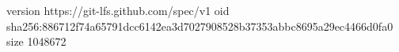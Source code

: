 version https://git-lfs.github.com/spec/v1
oid sha256:886712f74a65791dcc6142ea3d7027908528b37353abbc8695a29ec4466d0fa0
size 1048672
